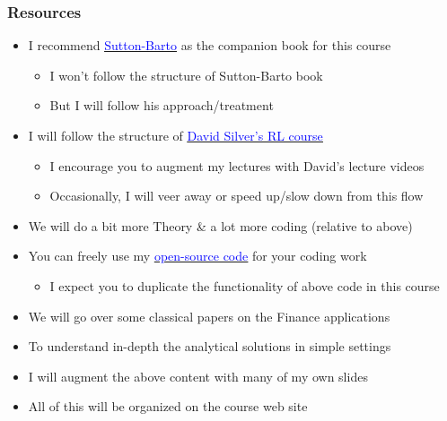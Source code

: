 \documentclass[handout]{beamer}
\begin{document}
\begin{frame}
\frametitle{Resources}
\pause
\begin{itemize}[<+->]
\item I recommend \href{http://incompleteideas.net/book/the-book-2nd.html}{\underline{\textcolor{blue}{Sutton-Barto}}} as the companion book for this course
\begin{itemize}
\item I won't follow the structure of Sutton-Barto book
\item But I will follow his approach/treatment
\end{itemize}
\item I will follow the structure of \href{http://www0.cs.ucl.ac.uk/staff/d.silver/web/Teaching.html}{\underline{\textcolor{blue}{David Silver's RL course}}}
\begin{itemize}
\item I encourage you to augment my lectures with David's lecture videos
\item Occasionally, I will veer away or speed up/slow down from this flow
\end{itemize}
\item We will do a bit more Theory \& a lot more coding (relative to above)
\item You can freely use my \href{https://github.com/coverdrive/MDP-DP-RL}{\underline{\textcolor{blue}{open-source code}}} for your coding work
\begin{itemize}
\item I expect you to duplicate the functionality of above code in this course
\end{itemize}
\item We will go over some classical papers on the Finance applications
\item To understand in-depth the analytical solutions in simple settings
\item I will augment the above content with many of my own slides
\item All of this will be organized on the course web site
\end{itemize}
\end{frame}
\end{document}
